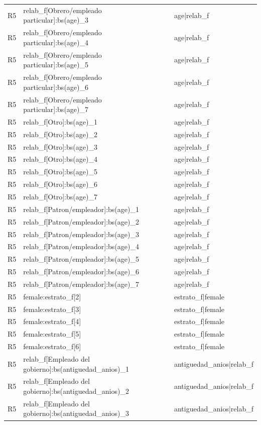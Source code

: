 \begin{longtable}{lll}
R5 & relab\_f[Obrero/empleado particular]:bs(age)\_3 & age|relab\_f \\
R5 & relab\_f[Obrero/empleado particular]:bs(age)\_4 & age|relab\_f \\
R5 & relab\_f[Obrero/empleado particular]:bs(age)\_5 & age|relab\_f \\
R5 & relab\_f[Obrero/empleado particular]:bs(age)\_6 & age|relab\_f \\
R5 & relab\_f[Obrero/empleado particular]:bs(age)\_7 & age|relab\_f \\
R5 & relab\_f[Otro]:bs(age)\_1 & age|relab\_f \\
R5 & relab\_f[Otro]:bs(age)\_2 & age|relab\_f \\
R5 & relab\_f[Otro]:bs(age)\_3 & age|relab\_f \\
R5 & relab\_f[Otro]:bs(age)\_4 & age|relab\_f \\
R5 & relab\_f[Otro]:bs(age)\_5 & age|relab\_f \\
R5 & relab\_f[Otro]:bs(age)\_6 & age|relab\_f \\
R5 & relab\_f[Otro]:bs(age)\_7 & age|relab\_f \\
R5 & relab\_f[Patron/empleador]:bs(age)\_1 & age|relab\_f \\
R5 & relab\_f[Patron/empleador]:bs(age)\_2 & age|relab\_f \\
R5 & relab\_f[Patron/empleador]:bs(age)\_3 & age|relab\_f \\
R5 & relab\_f[Patron/empleador]:bs(age)\_4 & age|relab\_f \\
R5 & relab\_f[Patron/empleador]:bs(age)\_5 & age|relab\_f \\
R5 & relab\_f[Patron/empleador]:bs(age)\_6 & age|relab\_f \\
R5 & relab\_f[Patron/empleador]:bs(age)\_7 & age|relab\_f \\
R5 & female:estrato\_f[2] & estrato\_f|female \\
R5 & female:estrato\_f[3] & estrato\_f|female \\
R5 & female:estrato\_f[4] & estrato\_f|female \\
R5 & female:estrato\_f[5] & estrato\_f|female \\
R5 & female:estrato\_f[6] & estrato\_f|female \\
R5 & relab\_f[Empleado del gobierno]:bs(antiguedad\_anios)\_1 & antiguedad\_anios|relab\_f \\
R5 & relab\_f[Empleado del gobierno]:bs(antiguedad\_anios)\_2 & antiguedad\_anios|relab\_f \\
R5 & relab\_f[Empleado del gobierno]:bs(antiguedad\_anios)\_3 & antiguedad\_anios|relab\_f \\

\end{longtable}
